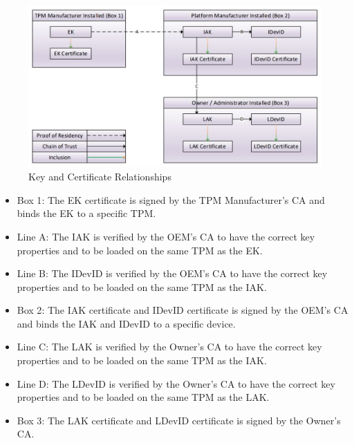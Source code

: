  
\begin{figure}[h]
  \begin{centering}
  \includegraphics[width=\linewidth]{chap_3_figures/certificateRelationships.jpg}
  \par\end{centering}
  \caption{Key and Certificate Relationships \cite{DevIDSpec-TCG}}
  \label{fig:cert_rel}
\end{figure}
\vspace{2em}
\begin{itemize}[itemsep=0pt,parsep=0pt,partopsep=0pt]
  \item \textsf{Box 1}: The EK certificate is signed by the TPM Manufacturer's CA and binds the EK to a specific TPM.
  \item \textsf{Line A}: The IAK is verified by the OEM's CA to have the correct key properties and to be loaded on the same TPM as the EK.
  \item \textsf{Line B}: The IDevID is verified by the OEM's CA to have the correct key properties and to be loaded on the same TPM as the IAK.
  \item \textsf{Box 2}: The IAK certificate and IDevID certificate is signed by the OEM's CA and binds the IAK and IDevID to a specific device.
  \item \textsf{Line C}: The LAK is verified by the Owner's CA to have the correct key properties and to be loaded on the same TPM as the IAK.
  \item \textsf{Line D}: The LDevID is verified by the Owner's CA to have the correct key properties and to be loaded on the same TPM as the LAK.
  \item \textsf{Box 3}: The LAK certificate and LDevID certificate is signed by the Owner's CA.
\end{itemize}

